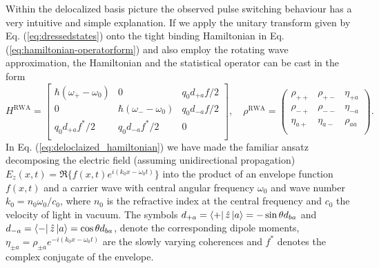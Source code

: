 \documentclass[]{spie}  %
\begin{document}
Within the delocalized basis picture the observed pulse switching behaviour has a very intuitive and simple explanation. If we apply the unitary transform given by Eq. (\ref{eq:dressedstates}) onto the tight binding Hamiltonian in Eq. (\ref{eq:hamiltonian-operatorform}) and also employ the rotating wave approximation, the Hamiltonian and the statistical operator can be cast in the form
\begin{equation}
H^{\text{RWA}} = \begin{bmatrix}
\hbar (\omega_+-\omega_0) & 0 & q_0d_{+a}f/2 \\
0 & \hbar (\omega_--\omega_0) & q_0d_{-a}f/2 \\
q_0d_{+a}f^*/2 & q_0d_{-a}f^*/2 & 0 \\
\end{bmatrix},\quad \rho^{\text{RWA}} = \begin{pmatrix}
\rho_{++} & \rho_{+-} & \eta_{+a} \\ 
\rho_{-+} & \rho_{--} & \eta_{-a} \\ 
\eta_{a+} & \eta_{a-} & \rho_{aa} \\ 
\end{pmatrix}. \label{eq:deloclaized_hamiltonian}
\end{equation}
In Eq. (\ref{eq:deloclaized_hamiltonian}) we have made the familiar ansatz decomposing the electric field (assuming unidirectional propagation) $E_z(x,t) = \Re\{f(x,t) e^{i(k_0x-\omega_0 t)}\}$ into the product of an envelope function $f(x,t)$ and a carrier wave with central angular frequency $\omega_0$ and wave number $k_0 = n_0\omega_0/c_0$, where $n_0$ is the refractive index at the central frequency and $c_0$ the velocity of light in vacuum. The symbols $d_{+a} = \Bra{+}\hat{z}\Ket{a} = -\sin\theta d_{ba}  $ and $d_{-a} = \Bra{-}\hat{z}\Ket{a} = \cos\theta d_{ba}$, denote the corresponding dipole moments, $ \eta_{\pm a} = \rho_{\pm a}e^{-i(k_0x-\omega_0 t)}$ are the slowly varying coherences and $f^*$ denotes the complex conjugate of the envelope.
\end{document}
